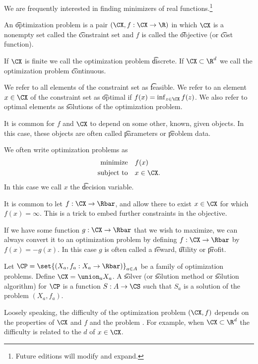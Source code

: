 

We are frequently interested in finding minimizers of real functions.\footnote{Future editions will modify and expand.}


An \t{optimization problem} is a pair $(\CX, f: \CX \to \R)$ in which $\CX$ is a nonempty set called the \t{constraint set} and $f$ is called the \t{objective} (or \t{cost function}).

If $\CX$ is finite we call the optimization problem \t{discrete}.
If $\CX \subset \R^d$ we call the optimization problem \t{continuous}.

We refer to all elements of the constraint set as \t{feasible}.
We refer to an element $x \in \CX$ of the constraint set as \t{optimal} if $f(x) = \inf_{z \in \CX}f(z)$.
We also refer to optimal elements as \t{solutions} of the optimization problem.

It is common for $f$ and $\CX$ to depend on some other, known, given objects.
In this case, these objects are often called \t{parameters} or \t{problem data}.


We often write optimization problems as
\[
  \begin{aligned}
  \text{minimize}\quad & f(x) \\
  \text{subject to}\quad & x \in \CX.
  \end{aligned}
\]
In this case we call $x$ the \t{decision variable}.


It is common to let $f: \CX \to \Rbar$, and allow there to exist $x \in \CX$ for which $f(x) = \infty$.
This is a trick to embed further constraints in the objective.


If we have some function $g: \CX \to \Rbar$ that we wish to maximize, we can always convert it to an optimization problem by defining $f: \CX \to \Rbar$ by $f(x) = -g(x)$.
In this case $g$ is often called a \t{reward}, \t{utility} or \t{profit}.


Let $\CP = \set{(X_a, f_a: X_a \to \Rbar)}_{a \in A}$ be a family of optimization problems.
Define $\CX = \union_a X_a$.
A \t{solver} (or \t{solution method} or \t{solution algorithm}) for $\CP$ is a function $S: A \to \CS$ such that $S_a$ is a solution of the problem $(X_a, f_a)$.

Loosely speaking, the difficulty of  the optimization problem $(\CX, f)$ depends on the properties of $\CX$ and $f$ and the problem .
For example, when $\CX \subset \R^d$ the difficulty is related to the  $d$ of $x \in \CX$.
